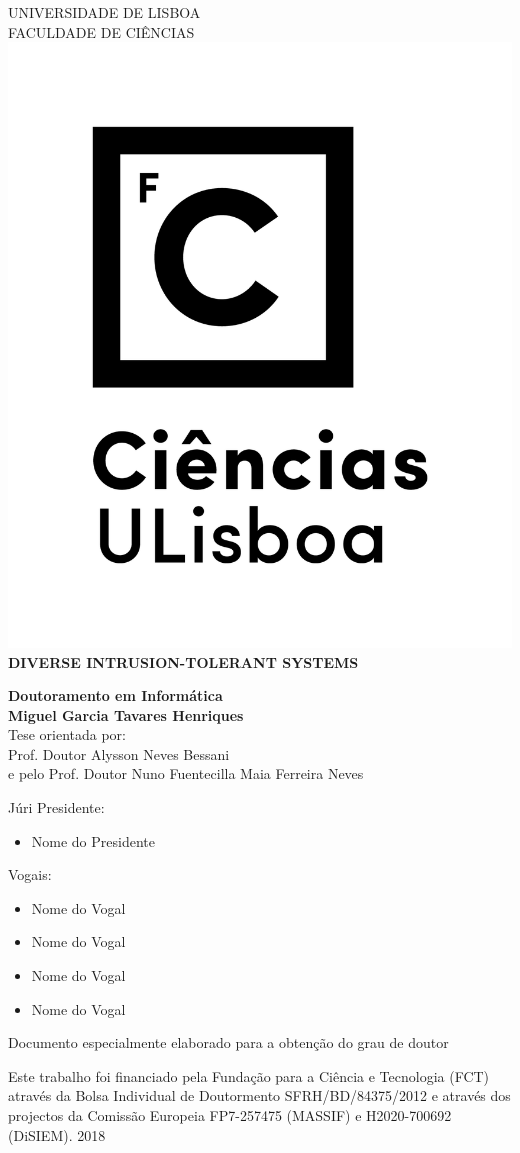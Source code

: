 \documentclass[
 paper=A4,               %
    twoside=true,           %
    openright,              %
    parskip=full,           %
    chapterprefix=true,     %
    11pt,                   %
    headings=normal,        %
    bibliography=totoc,     %
    listof=totoc,           %
    titlepage=on,           %
    captions=tableabove,    %
    draft=false,            %
]{scrreprt}
\theoremstyle{definition}
\newcommand{\TITULO}{DIVERSE INTRUSION-TOLERANT SYSTEMS}
\newcommand{\Autor}{Miguel Garcia Tavares Henriques}
\newcommand{\Orientador}{Alysson Neves Bessani}
\newcommand{\CoOrientador}{Nuno Fuentecilla Maia Ferreira Neves} %
\newcommand{\Ano}{\Large{2018}}
\newcommand{\DOUTORAMENTO}{Doutoramento em Inform\'{a}tica}
\newcommand{\IdiomaTese}{\selectlanguage{english}}
\newcommand{\Especialidade}{}
\newcommand{\Cabecalho}{
\vspace{1cm}\normalfont\normalfont
\vfill
\textsc{\normalsize\uppercase{Universidade de Lisboa}}\\
\normalsize\uppercase{Faculdade de Ci\^{e}ncias}\\
\vspace{1cm}
\includegraphics[scale=.45]{pic/logo_fcul_vertical.png}\\
}
\begin{document}
\begin{center}

\Cabecalho

\vspace{0.5cm}
\vfill
\IdiomaTese
\Large{\bf \TITULO}\\
\vspace{1cm}
\vfill

\large{\bf{\DOUTORAMENTO}}\\
\vspace{1cm}
\vfill
\Large{\bf \Autor}\\
\vspace{.5 cm}
\vfill
\large{Tese orientada por:}\\
\large{Prof. Doutor \Orientador} \\
e pelo Prof. Doutor \CoOrientador \\
\vspace{.5 cm}
\vfill

\begin{flushleft}  
\large{J\'{u}ri}
\vfill
\setlength{\leftskip}{0.5cm}
\normalsize{Presidente:}
\begin{itemize}
\setlength\itemsep{-0.5 em}
\item{Nome do Presidente}
\end{itemize}
\normalsize{Vogais:}
\begin{itemize}
\setlength\itemsep{-0.5 em}
\item{Nome do Vogal}
\item{Nome do Vogal}
\item{Nome do Vogal}
\item{Nome do Vogal}
\end{itemize}
\setlength{\leftskip}{0cm}
\end{flushleft}
\vspace{0.0cm}
\vfill

\normalsize{Documento especialmente elaborado para a obten\c{c}\~{a}o do grau de doutor\par}
\vspace{0.0cm}
\normalsize{Este trabalho foi financiado pela Funda\c{c}\~{a}o para a Ci\^{e}ncia e Tecnologia (FCT) atrav\'{e}s da Bolsa Individual de Doutormento SFRH/BD/84375/2012 e atrav\'{e}s dos projectos da Comiss\~{a}o Europeia FP7-257475 (MASSIF) e H2020-700692 (DiSIEM).}
\vspace{0.cm}
\vfill
\Ano
\end{center}
\newpage
\mbox{}
\newpage
\end{document}
